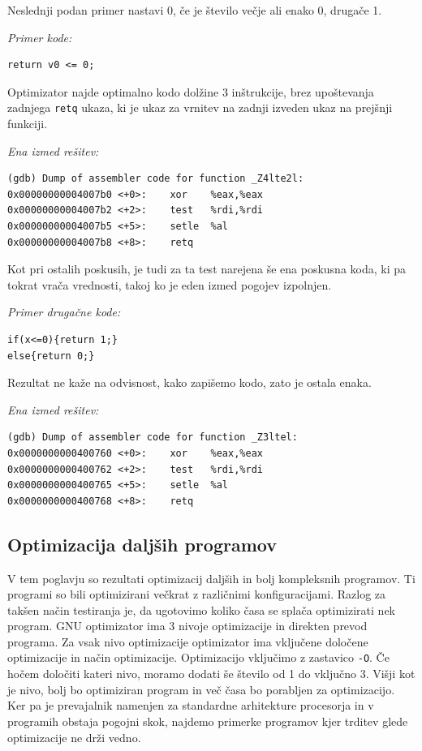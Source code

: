 \documentclass[a4paper, 12pt]{book}
\begin{document}
Neslednji podan primer nastavi 0, če je število večje ali enako 0, drugače 1.
\medskip

\noindent
{\it Primer kode:}
\begin{Verbatim}[baselinestretch=1]
return v0 <= 0;
\end{Verbatim}
Optimizator najde optimalno kodo dolžine 3 inštrukcije, brez upoštevanja zadnjega \texttt{retq} ukaza, ki je ukaz za vrnitev na zadnji izveden ukaz na prejšnji funkciji.
\medskip

\noindent
{\it Ena izmed rešitev:}
\begin{Verbatim}[baselinestretch=1]
(gdb) Dump of assembler code for function _Z4lte2l:
0x00000000004007b0 <+0>:	xor    %eax,%eax
0x00000000004007b2 <+2>:	test   %rdi,%rdi
0x00000000004007b5 <+5>:	setle  %al
0x00000000004007b8 <+8>:	retq 
\end{Verbatim}

Kot pri ostalih poskusih, je tudi za ta test narejena še ena poskusna koda, ki pa tokrat vrača vrednosti, takoj ko je eden izmed pogojev izpolnjen.

\medskip

\noindent
{\it Primer drugačne kode:}
\begin{Verbatim}[baselinestretch=1]
if(x<=0){return 1;}
else{return 0;}
\end{Verbatim}
Rezultat ne kaže na odvisnost, kako zapišemo kodo, zato je ostala enaka.
\medskip

\noindent
{\it Ena izmed rešitev:}
\begin{Verbatim}[baselinestretch=1]
(gdb) Dump of assembler code for function _Z3ltel:
0x0000000000400760 <+0>:	xor    %eax,%eax
0x0000000000400762 <+2>:	test   %rdi,%rdi
0x0000000000400765 <+5>:	setle  %al
0x0000000000400768 <+8>:	retq
\end{Verbatim}
\subsection{Optimizacija daljših programov}

V tem poglavju so rezultati optimizacij daljših in bolj kompleksnih programov. Ti programi so bili optimizirani večkrat z različnimi konfiguracijami. Razlog za takšen način testiranja je, da ugotovimo koliko časa se splača optimizirati nek program. GNU optimizator ima 3 nivoje optimizacije in direkten prevod programa. Za vsak nivo optimizacije optimizator ima vključene določene optimizacije in način optimizacije. Optimizacijo vključimo z zastavico \texttt{-O}. Če hočem določiti kateri nivo, moramo dodati še število od 1 do vključno 3. Višji kot je nivo, bolj bo optimiziran program in več časa bo porabljen za optimizacijo. Ker pa je prevajalnik namenjen za standardne arhitekture procesorja in v programih obstaja pogojni skok, najdemo primerke programov kjer trditev glede optimizacije ne drži vedno.
\medskip
\end{document}
